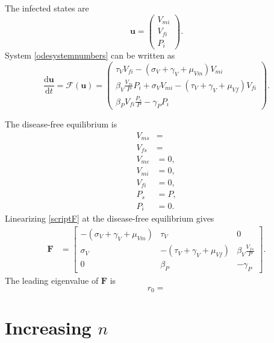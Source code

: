 \documentclass{article}
\newcommand{\md}{\mathrm{d}}
\newcommand{\mat}[1]{\mathbf{#1}}
\renewcommand{\vec}[1]{\mathbf{#1}}
\begin{document}
The infected states are
\begin{equation}
  \vec{u} =
  \begin{pmatrix}
    V_{mi} \\ V_{fi} \\ P_i
  \end{pmatrix}.
\end{equation}
System \eqref{odesystemnumbers} can be written as
\begin{equation}
  \label{scriptF}
  \frac{\md \vec{u}}{\md t}
  =
  \mathcal{F}(\vec{u})
  =
  \begin{pmatrix}
    \tau_V V_{fi}
    - (\sigma_V + \gamma_V + \mu_{Vm}) V_{mi}
    \\
    \beta_V \frac{V_{fs}}{P} P_i
    + \sigma_V V_{mi}
    - (\tau_V + \gamma_V + \mu_{Vf}) V_{fi}
    \\
    \beta_P V_{fi} \frac{P_s}{P} - \gamma_P P_i
  \end{pmatrix}.
\end{equation}

The disease-free equilibrium is
\begin{equation}
  \begin{split}
    V_{ms} &=
    \\
    V_{fs} &= 
    \\
    V_{me} &= 0,
    \\
    V_{mi} &= 0,
    \\
    V_{fi} &= 0,
    \\
    P_s &= P,
    \\
    P_i &= 0.
  \end{split}
\end{equation}
Linearizing \eqref{scriptF} at the disease-free equilibrium gives
\begin{equation}
  \begin{split}
    \mat{F} &=
    \begin{bmatrix}
    - (\sigma_V + \gamma_V + \mu_{Vm}) & \tau_V & 0
    \\
    \sigma_V & - (\tau_V + \gamma_V + \mu_{Vf}) &  \beta_V
    \frac{V_{fs}}{P}
    \\
    0 & \beta_P & - \gamma_P
    \end{bmatrix}.
  \end{split}
\end{equation}
The leading eigenvalue of $\mathbf{F}$ is
\begin{equation}
  r_0 = 
\end{equation}


\section{Increasing $n$}
\end{document}
